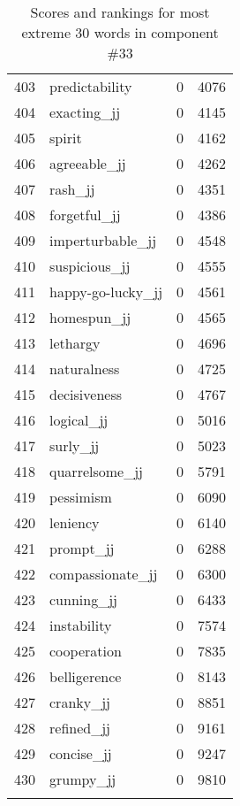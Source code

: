 \begin{longtable}[!htbp]{| rlr@{.}l |}
    403 & predictability & 0 & 4076 \\
    404 & exacting\_jj & 0 & 4145 \\
    405 & spirit & 0 & 4162 \\
    406 & agreeable\_jj & 0 & 4262 \\
    407 & rash\_jj & 0 & 4351 \\
    408 & forgetful\_jj & 0 & 4386 \\
    409 & imperturbable\_jj & 0 & 4548 \\
    410 & suspicious\_jj & 0 & 4555 \\
    411 & happy-go-lucky\_jj & 0 & 4561 \\
    412 & homespun\_jj & 0 & 4565 \\
    413 & lethargy & 0 & 4696 \\
    414 & naturalness & 0 & 4725 \\
    415 & decisiveness & 0 & 4767 \\
    416 & logical\_jj & 0 & 5016 \\
    417 & surly\_jj & 0 & 5023 \\
    418 & quarrelsome\_jj & 0 & 5791 \\
    419 & pessimism & 0 & 6090 \\
    420 & leniency & 0 & 6140 \\
    421 & prompt\_jj & 0 & 6288 \\
    422 & compassionate\_jj & 0 & 6300 \\
    423 & cunning\_jj & 0 & 6433 \\
    424 & instability & 0 & 7574 \\
    425 & cooperation & 0 & 7835 \\
    426 & belligerence & 0 & 8143 \\
    427 & cranky\_jj & 0 & 8851 \\
    428 & refined\_jj & 0 & 9161 \\
    429 & concise\_jj & 0 & 9247 \\
    430 & grumpy\_jj & 0 & 9810 \\
    \hline
    \caption{Scores and rankings for most extreme 30 words in component \#33} \\
\end{longtable}
